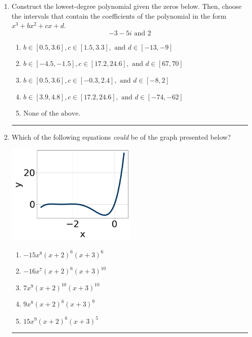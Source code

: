 \documentclass[14pt]{extbook}
\newcommand{\litem}[1]{\item#1\hspace*{-1cm}\rule{\textwidth}{0.4pt}}
\begin{document}
\begin{enumerate}
\litem{
Construct the lowest-degree polynomial given the zeros below. Then, choose the intervals that contain the coefficients of the polynomial in the form $x^3+bx^2+cx+d$.\[ -3 - 5 i \text{ and } 2 \]\begin{enumerate}[label=\Alph*.]
\item \( b \in [0.5, 3.6], c \in [1.5, 3.3], \text{ and } d \in [-13, -9] \)
\item \( b \in [-4.5, -1.5], c \in [17.2, 24.6], \text{ and } d \in [67, 70] \)
\item \( b \in [0.5, 3.6], c \in [-0.3, 2.4], \text{ and } d \in [-8, 2] \)
\item \( b \in [3.9, 4.8], c \in [17.2, 24.6], \text{ and } d \in [-74, -62] \)
\item \( \text{None of the above.} \)

\end{enumerate} }
\litem{
Which of the following equations \textit{could} be of the graph presented below?
\begin{center}
    \includegraphics[width=0.5\textwidth]{../Figures/polyGraphToFunctionCopyA.png}
\end{center}
\begin{enumerate}[label=\Alph*.]
\item \( -15x^{8} (x + 2)^{6} (x + 3)^{6} \)
\item \( -16x^{7} (x + 2)^{6} (x + 3)^{10} \)
\item \( 7x^{9} (x + 2)^{10} (x + 3)^{10} \)
\item \( 9x^{8} (x + 2)^{6} (x + 3)^{9} \)
\item \( 15x^{9} (x + 2)^{6} (x + 3)^{5} \)


\end{enumerate}}
\end{enumerate}
\end{document}

